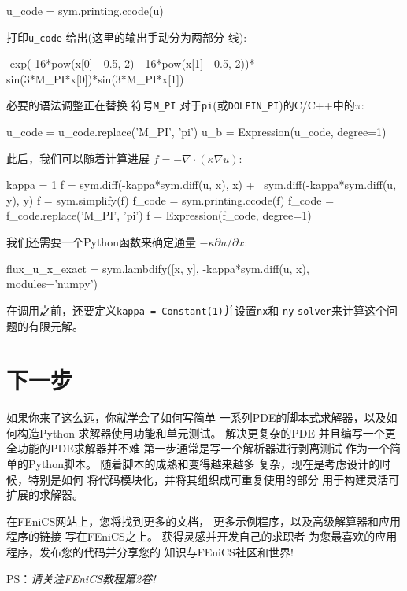 \begin{python}
u_code = sym.printing.ccode(u)
\end{python}
打印\verb!u_code! 给出(这里的输出手动分为两部分
线):

\begin{python}
-exp(-16*pow(x[0] - 0.5, 2) - 16*pow(x[1] - 0.5, 2))*
sin(3*M_PI*x[0])*sin(3*M_PI*x[1])
\end{python}
必要的语法调整正在替换
符号\verb!M_PI! 对于\texttt{pi}(或\verb!DOLFIN_PI!)的C/C++中的$\pi$:

\begin{python}
u_code = u_code.replace('M_PI', 'pi')
u_b = Expression(u_code, degree=1)
\end{python}
此后，我们可以随着计算进展
$f = -\nabla\cdot(\kappa\nabla u)$:

\begin{python}
kappa = 1
f = sym.diff(-kappa*sym.diff(u, x), x) + \
    sym.diff(-kappa*sym.diff(u, y), y)
f = sym.simplify(f)
f_code = sym.printing.ccode(f)
f_code = f_code.replace('M_PI', 'pi')
f = Expression(f_code, degree=1)
\end{python}
我们还需要一个Python函数来确定通量
$-\kappa\partial u/\partial x$:

\begin{python}
flux_u_x_exact = sym.lambdify([x, y], -kappa*sym.diff(u, x),
                              modules='numpy')
\end{python}
在调用之前，还要定义\texttt{kappa = Constant(1)}并设置\texttt{nx}和
\texttt{ny}
\texttt{solver}来计算这个问题的有限元解。

\section{下一步}

如果你来了这么远，你就学会了如何写简单
一系列PDE的脚本式求解器，以及如何构造Python
求解器使用功能和单元测试。 解决更复杂的PDE
并且编写一个更全功能的PDE求解器并不难
第一步通常是写一个解析器进行剥离测试
作为一个简单的Python脚本。 随着脚本的成熟和变得越来越多
复杂，现在是考虑设计的时候，特别是如何
将代码模块化，并将其组织成可重复使用的部分
用于构建灵活可扩展的求解器。

在FEniCS网站上，您将找到更多的文档，
更多示例程序，以及高级解算器和应用程序的链接
写在FEniCS之上。 获得灵感并开发自己的求职者
为您最喜欢的应用程序，发布您的代码并分享您的
知识与FEniCS社区和世界!

PS：\emph{请关注FEniCS教程第2卷!}
